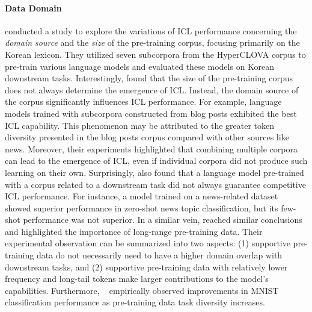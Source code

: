 \paragraph{Data Domain} 
\citet{Shin2022OnTE} conducted a study to explore the variations of ICL performance concerning the \textit{domain source} and the \emph{size} of the pre-training corpus, focusing primarily on the Korean lexicon. 
They utilized seven subcorpora from the HyperCLOVA corpus \cite{Kim2021WhatCC} to pre-train various language models and evaluated these models on Korean downstream tasks. 
Interestingly, \citet{Shin2022OnTE} found that the size of the pre-training corpus does not always determine the emergence of ICL. 
Instead, the domain source of the corpus significantly influences ICL performance. 
For example, language models trained with subcorpora constructed from blog posts exhibited the best ICL capability. 
This phenomenon may be attributed to the greater token diversity presented in the blog posts corpus compared with other sources like news. Moreover, their experiments highlighted that combining multiple corpora can lead to the emergence of ICL, even if individual corpora did not produce such learning on their own. 
Surprisingly, \citet{Shin2022OnTE} also found that a language model pre-trained with a corpus related to a downstream task did not always guarantee competitive ICL performance. 
For instance, a model trained on a news-related dataset~\citep{Park2021KLUEKL} showed  superior performance in zero-shot news topic classification, but its few-shot performance was not superior.
In a similar vein, \citet{Han2023UnderstandingIL} reached similar conclusions and highlighted the importance of long-range pre-training data.
Their experimental observation can be summarized into two aspects: (1)  supportive pre-training data do not necessarily need to have a higher domain overlap with downstream tasks, and (2) supportive pre-training data with relatively lower frequency and long-tail tokens make larger contributions to the model's capabilities.
Furthermore, ~\citet{Raventos2023PretrainingTD} empirically observed improvements in MNIST classification performance as pre-training data task diversity increases. 
\vspace{-3mm}
